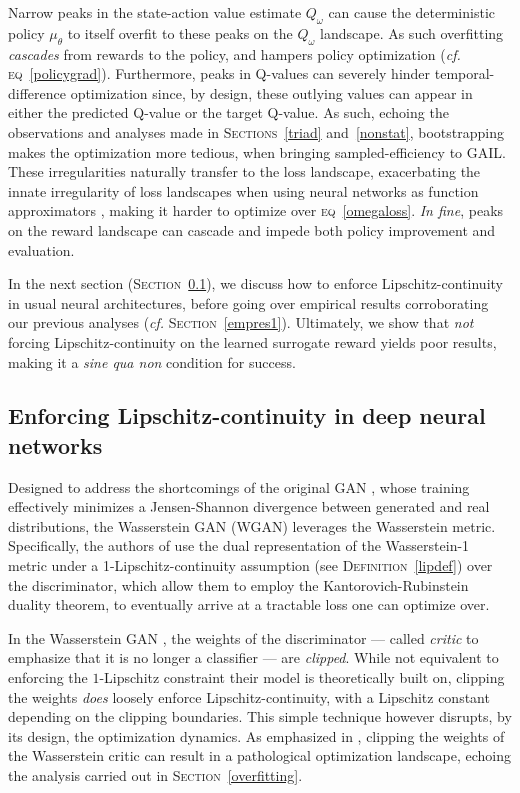 Narrow peaks in the state-action value estimate $Q_\omega$
can cause the deterministic policy $\mu_\theta$
to itself overfit to these peaks on the $Q_\omega$ landscape.
As such overfitting \emph{cascades} from rewards to the policy,
and hampers policy optimization (\textit{cf.} \textsc{eq}~\ref{policygrad}).
Furthermore, peaks in Q-values can severely hinder temporal-difference optimization since,
by design, these outlying values can appear in either the predicted Q-value or
the target Q-value.
As such, echoing the observations and analyses made in
\textsc{Sections}~\ref{triad} and~\ref{nonstat},
bootstrapping makes the optimization more tedious,
when bringing sampled-efficiency to GAIL.
These irregularities naturally transfer to the loss landscape,
exacerbating the innate irregularity of loss landscapes when using
neural networks as function approximators \cite{Li2018-ko},
making it harder to optimize over \textsc{eq}~\ref{omegaloss}.
\textit{In fine}, peaks on the reward landscape can cascade
and impede both policy improvement and evaluation.

In the next section (\textsc{Section}~\ref{gradpen}),
we discuss how to enforce Lipschitz-continuity in usual neural architectures,
before going over empirical results corroborating our previous analyses
(\textit{cf.} \textsc{Section}~\ref{empres1}).
Ultimately, we show that \textit{not} forcing Lipschitz-continuity on the learned surrogate reward
yields poor results, making it a \textit{sine qua non} condition for success.

\subsection{Enforcing Lipschitz-continuity in deep neural networks}
\label{gradpen}

Designed to address the shortcomings of the original GAN \cite{Goodfellow2014-yk},
whose training effectively minimizes a Jensen-Shannon divergence between
generated and real distributions,
the Wasserstein GAN (WGAN) \cite{Arjovsky2017-la} leverages
the Wasserstein metric.
Specifically, the authors of \cite{Arjovsky2017-la}
use the dual representation of the Wasserstein-1 metric
under a 1-Lipschitz-continuity assumption
(see \textsc{Definition}~\ref{lipdef})
over the discriminator,
which allow them to employ the
Kantorovich-Rubinstein duality theorem,
to eventually arrive at a tractable loss
one can optimize over.

In the Wasserstein GAN \cite{Arjovsky2017-la},
the weights of the discriminator
--- called \emph{critic} to emphasize that it is no longer a classifier ---
are \emph{clipped}.
While not equivalent to enforcing the $1$-Lipschitz constraint their
model is theoretically built on,
clipping the weights \emph{does} loosely enforce Lipschitz-continuity, with
a Lipschitz constant depending on the clipping boundaries.
This simple technique however disrupts, by its design, the optimization dynamics.
As emphasized in \cite{Gulrajani2017-mr}, clipping the weights of the Wasserstein critic
can result in a pathological optimization landscape,
echoing the analysis carried out in \textsc{Section}~\ref{overfitting}.

